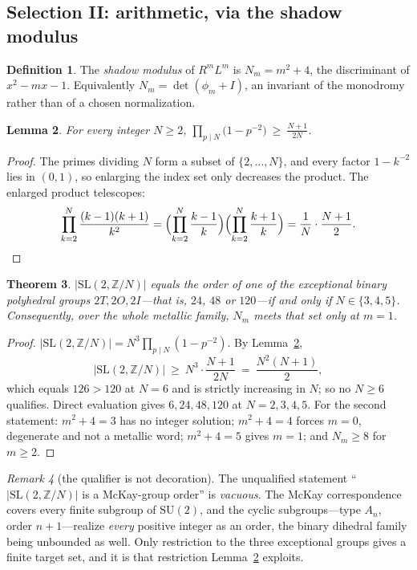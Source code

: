 \documentclass[11pt,reqno]{amsart}
\theoremstyle{plain}
\newtheorem{theorem}{Theorem}[section]
\newtheorem{lemma}[theorem]{Lemma}
\theoremstyle{definition}
\newtheorem{definition}[theorem]{Definition}
\theoremstyle{remark}
\newtheorem{remark}[theorem]{Remark}
\newcommand{\Z}{\mathbb{Z}}
\newcommand{\SL}{\mathrm{SL}}
\newcommand{\SU}{\mathrm{SU}}
\begin{document}
\subsection{Selection II: arithmetic, via the shadow modulus}\label{sec:shadow}

\begin{definition}
The \emph{shadow modulus} of $R^mL^m$ is $N_m=m^2+4$, the discriminant of $x^2-mx-1$.
Equivalently $N_m=\det(\phi_m+I)$, an invariant of the monodromy rather than of a chosen
normalization.
\end{definition}

\begin{lemma}\label{lem:telescope}
For every integer $N\ge2$, $\displaystyle\prod_{p\mid N}\bigl(1-p^{-2}\bigr)\ \ge\
\frac{N+1}{2N}$.
\end{lemma}

\begin{proof}
The primes dividing $N$ form a subset of $\{2,\dots,N\}$, and every factor $1-k^{-2}$
lies in $(0,1)$, so enlarging the index set only decreases the product. The enlarged
product telescopes:
\[
   \prod_{k=2}^{N}\frac{(k-1)(k+1)}{k^{2}}
   =\Bigl(\prod_{k=2}^{N}\frac{k-1}{k}\Bigr)\Bigl(\prod_{k=2}^{N}\frac{k+1}{k}\Bigr)
   =\frac{1}{N}\cdot\frac{N+1}{2}. \qedhere
\]
\end{proof}

\begin{theorem}\label{thm:shadow}
$|\SL(2,\Z/N)|$ equals the order of one of the exceptional binary polyhedral groups
$2T,2O,2I$---that is, $24$, $48$ or $120$---if and only if $N\in\{3,4,5\}$. Consequently,
over the whole metallic family, $N_m$ meets that set only at \textbf{$m=1$}.
\end{theorem}

\begin{proof}
$|\SL(2,\Z/N)|=N^{3}\prod_{p\mid N}(1-p^{-2})$. By Lemma~\ref{lem:telescope},
\[
  |\SL(2,\Z/N)|\ \ge\ N^{3}\cdot\frac{N+1}{2N}\ =\ \frac{N^{2}(N+1)}{2},
\]
which equals $126>120$ at $N=6$ and is strictly increasing in $N$; so no $N\ge6$
qualifies. Direct evaluation gives $6,24,48,120$ at $N=2,3,4,5$. For the second
statement: $m^2+4=3$ has no integer solution; $m^2+4=4$ forces $m=0$, degenerate and not
a metallic word; $m^2+4=5$ gives $m=1$; and $N_m\ge8$ for $m\ge2$.
\end{proof}

\begin{remark}[the qualifier is not decoration]\label{rem:vacuous}
The unqualified statement ``$|\SL(2,\Z/N)|$ is a McKay-group order'' is \emph{vacuous}.
The McKay correspondence covers every finite subgroup of $\SU(2)$, and the cyclic
subgroups---type $A_n$, order $n+1$---realize \emph{every} positive integer as an order,
the binary dihedral family being unbounded as well. Only restriction to the three
exceptional groups gives a finite target set, and it is that restriction
Lemma~\ref{lem:telescope} exploits.
\end{remark}
\end{document}
